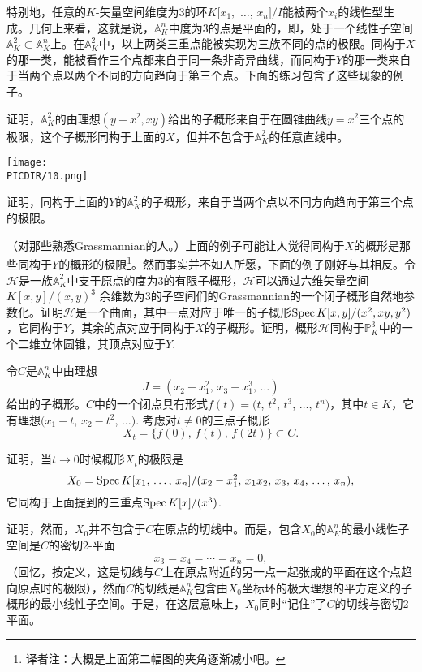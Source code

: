 特别地，任意的$K$\hyp 矢量空间维度为3的环$K[x_1,$ $\dots$, $x_n]/I$能被两个$x_i$的线性型生成。几何上来看，这就是说，$\mathbb{A}_K^n$中度为3的点是平面的，即，处于一个线性子空间$\mathbb{A}_K^2\subset \mathbb{A}_K^n$上。在$\mathbb{A}_K^2$中，以上两类三重点能被实现为三族不同的点的极限。同构于$X$的那一类，能被看作三个点都来自于同一条非奇异曲线，而同构于$Y$的那一类来自于当两个点以两个不同的方向趋向于第三个点。下面的练习包含了这些现象的例子。

\begin{exe}
	\begin{compactenum}[(i)]
		\item 证明，$\mathbb{A}_K^2$的由理想$(y-x^2,xy)$给出的子概形来自于在圆锥曲线$y=x^2$三个点的极限，这个子概形同构于上面的$X$，但并不包含于$\mathbb{A}_K^2$的任意直线中。

		\begin{center}\texttt{[image: \\PICDIR/10.png]}\end{center}

		\item 证明，同构于上面的$Y$的$\mathbb{A}_K^2$的子概形，来自于当两个点以不同方向趋向于第三个点的极限。
	\end{compactenum}
\end{exe}

\begin{exe} （对那些熟悉Grassmannian的人。）上面的例子可能让人觉得同构于$X$的概形是那些同构于$Y$的概形的极限\footnote{译者注：大概是上面第二幅图的夹角逐渐减小吧。}。然而事实并不如人所愿，下面的例子刚好与其相反。令$\mathscr{H}$是一族$\mathbb{A}_K^2$中支于原点的度为$3$的有限子概形，$\mathscr{H}$可以通过六维矢量空间$K[x,y]/(x,y)^3$ 余维数为$3$的子空间们的Grassmannian的一个闭子概形自然地参数化。证明$\mathscr{H}$是一个曲面，其中一点对应于唯一的子概形$\operatorname{Spec} K[x,y]/(x^2,xy,y^2)$，它同构于$Y$，其余的点对应于同构于$X$的子概形。证明，概形$\mathscr{H}$同构于$\mathbb{P}^3_K$中的一个二维立体圆锥，其顶点对应于$Y$.
\end{exe}

\begin{exe}
	令$C$是$\mathbb{A}_K^n$中由理想
	\[
	J=(\text{$x_2-x_1^2$, $x_3-x_1^3$, $\dots$})
	\]
	给出的子概形。$C$中的一个闭点具有形式$f(t)=(t$, $t^2$, $t^3$, $\dots$, $t^n)$，其中$t\in K$，它有理想$(x_1-t$, $x_2-t^2$, $\dots)$. 考虑对$t\neq 0$的三点子概形
	\[
	X_t=\{\text{$f(0)$, $f(t)$, $f(2t)$}\}\subset C.
	\]

	\begin{compactenum}[(a)]
		\item 证明，当$t\to 0$时候概形$X_t$的极限是
		\[
		X_0=\operatorname{Spec} K[\text{$x_1$, $\dots$, $x_n$}]/(\text{$x_2-x_1^2$, $x_1x_2$, $x_3$, $x_4$, $\dots$, $x_n$}),
		\]
		它同构于上面提到的三重点$\operatorname{Spec} K[x]/(x^3)$.
		\item 证明，然而，$X_0$并不包含于$C$在原点的切线中。而是，包含$X_0$的$\mathbb{A}_K^n$的最小线性子空间是$C$的密切2-平面
		\[
		x_3=x_4=\cdots=x_n=0,
		\]
		（回忆，按定义，这是切线与$C$上在原点附近的另一点一起张成的平面在这个点趋向原点时的极限），然而$C$的切线是$\mathbb{A}_K^n$包含由$X_0$坐标环的极大理想的平方定义的子概形的最小线性子空间。于是，在这层意味上，$X_0$同时“记住”了$C$的切线与密切2-平面。
	\end{compactenum}
\end{exe}

